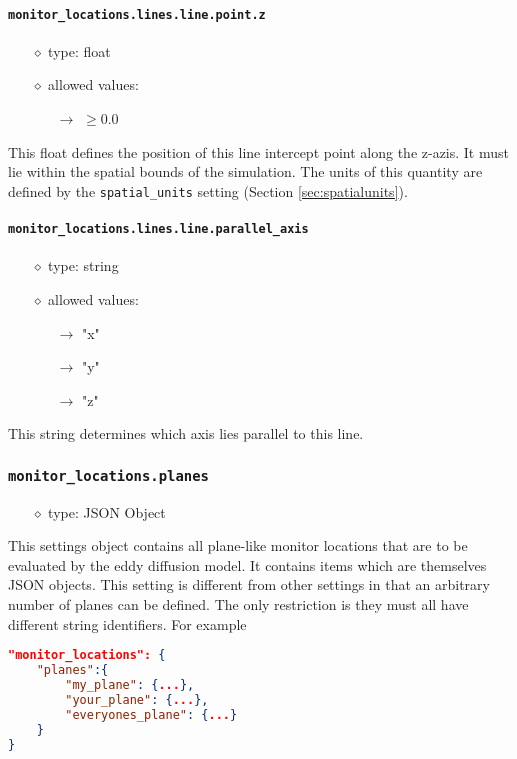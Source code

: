 \documentclass[]{article}
\def\code#1{\texttt{#1}}
\begin{document}
\paragraph{\code{monitor\_locations.lines.line.point.z}}
\begin{itemize}
    \item[$\diamond$] type: float 
    \item[$\diamond$] allowed values:
    \begin{itemize}
        \item[$\rightarrow$] $\geq0.0$
    \end{itemize}
\end{itemize}
This float defines the position of this line intercept point along the z-azis. It
must lie within the spatial bounds of the simulation. The units of this quantity
are defined by the \code{spatial\_units} setting (Section
\ref{sec:spatialunits}).


\paragraph{\code{monitor\_locations.lines.line.parallel\_axis}}
\begin{itemize}
    \item[$\diamond$] type: string 
    \item[$\diamond$] allowed values:
    \begin{itemize}
        \item[$\rightarrow$] "x"
        \item[$\rightarrow$] "y"
        \item[$\rightarrow$] "z"
    \end{itemize}
\end{itemize}
This string determines which axis lies parallel to this line.

\subsubsection{\code{monitor\_locations.planes}}\label{sec:monplanes}
\begin{itemize}
    \item[$\diamond$] type: JSON Object 
\end{itemize}
This settings object contains all plane-like monitor locations that are to be
evaluated by the eddy diffusion model. It contains items which
are themselves JSON objects. This setting is different from other settings in
that an arbitrary number of planes can be defined. The only restriction is they
must all have different string identifiers. For example\\
\begin{lstlisting}[language=json,firstnumber=1]
"monitor_locations": {
    "planes":{
        "my_plane": {...},
        "your_plane": {...},
        "everyones_plane": {...}
    }
}
\end{lstlisting}
\medskip
\end{document}
